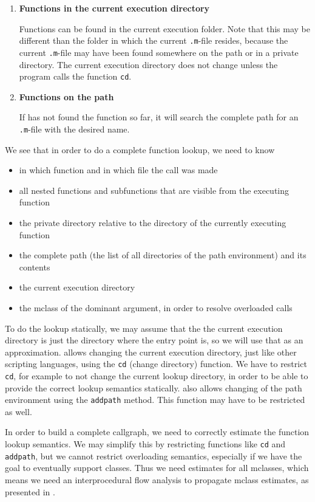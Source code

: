 \begin{enumerate}
\item
\textbf{      Functions in the current execution directory}

      Functions can be found in the current execution folder. Note that this may be different
      than the folder in which the current {\tt .m}-file resides, because the current {\tt .m}-file may
      have been found somewhere on the path or in a private directory. The current
      execution directory does not change unless the program calls the function {\tt cd}.

\item
\textbf{      Functions on the path}

      If \matlab has not found the function so far, it will search the complete path for an 
      {\tt .m}-file with the desired name. 
\end{enumerate}


We see that in order to do a complete function lookup, we need to know

\begin{itemize}
\item in which function and in which file the call was made
\item all nested functions and subfunctions that are visible from the executing function
\item the private directory relative to the directory of the currently executing function
\item the complete path (the list of all directories of the path environment) and its contents
\item the current execution directory
\item the mclass of the dominant argument, in order to resolve overloaded calls
\end{itemize}

To do the lookup statically, we may assume that the
the current execution directory is just the directory where
the entry point is, so we will use that as an approximation.
 \matlab allows changing the current execution directory, just like other
scripting languages, using the \lstinline{cd} (change directory)
function. We have to restrict \lstinline{cd}, for example to not change the current lookup directory, in
order to be able to provide the correct lookup semantics statically.
\matlab also allows changing of the path environment using the 
\lstinline{addpath} method. This function may have to be restricted as well.

In order to build a complete callgraph, we need to correctly estimate the function lookup
semantics. We may simplify this by restricting functions like {\tt cd} and {\tt addpath},
but we cannot restrict overloading semantics, especially if we have the goal to eventually support
\matlab classes. Thus we need estimates for all mclasses, which means we need an
interprocedural flow analysis to propagate mclass estimates, as presented in 
.


